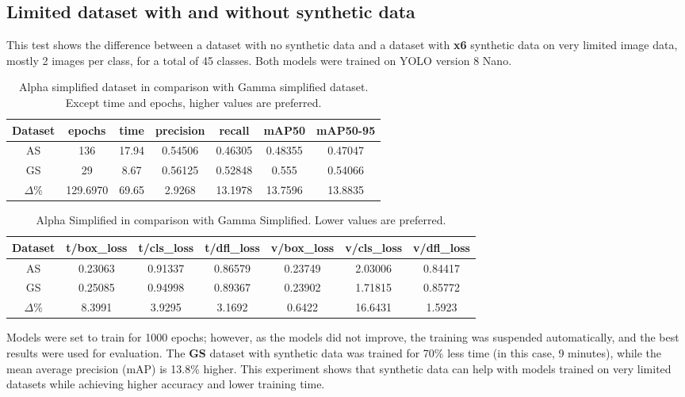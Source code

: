 \subsection{Limited dataset with and without synthetic data}
This test shows the difference between a dataset with no synthetic data and a dataset with \textbf{x6} synthetic data on very limited image data, mostly 2 images per class, for a total of 45 classes. Both models were trained on YOLO version 8 Nano.

\begin{table}[hbt]
\caption{Alpha simplified dataset in comparison with Gamma simplified dataset. Except time and epochs, higher values are preferred.}
\centering
\begin{tabular}{|c|c|c|c|c|c|c|}
\hline
Dataset    & epochs   & time  & precision & recall & mAP50 & mAP50-95 \\ \hline
AS         & 136      & 17.94 & 0.54506      & 0.46305   & 0.48355  & 0.47047     \\ \hline
GS         & 29       & 8.67  & 0.56125      & 0.52848   & 0.555    & 0.54066     \\ \hline
$\Delta$\% & 129.6970 & 69.65 & 2.9268       & 13.1978   & 13.7596  & 13.8835     \\ \hline
\end{tabular}
\end{table}

\begin{table}[hbt]
\caption{Alpha Simplified in comparison with Gamma Simplified. Lower values are preferred.}
\centering
\begin{tabular}{|c|c|c|c|c|c|c|}
\hline
Dataset & t/box\_loss & t/cls\_loss & t/dfl\_loss & v/box\_loss & v/cls\_loss & v/dfl\_loss \\ \hline
AS         & 0.23063 & 0.91337 & 0.86579 & 0.23749 & 2.03006 & 0.84417 \\ \hline
GS         & 0.25085 & 0.94998 & 0.89367 & 0.23902 & 1.71815 & 0.85772 \\ \hline
$\Delta$\% & 8.3991  & 3.9295  & 3.1692  & 0.6422  & 16.6431 & 1.5923  \\ \hline
\end{tabular}
\end{table}



Models were set to train for 1000 epochs; however, as the models did not improve, the training was suspended automatically, and the best results were used for evaluation. The \textbf{GS} dataset with synthetic data was trained for 70\% less time (in this case, 9 minutes), while the mean average precision (mAP) is 13.8\% higher. This experiment shows that synthetic data can help with models trained on very limited datasets while achieving higher accuracy and lower training time.

